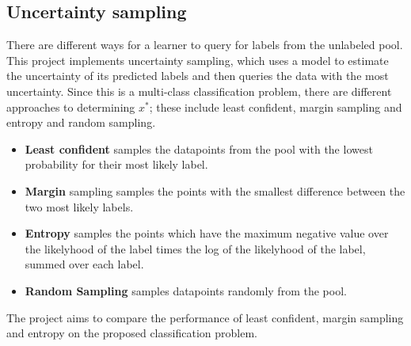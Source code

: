 \documentclass[12pt,fleqn]{article}
\begin{document}
\begin{multicols}{2}
		\subsection{Uncertainty sampling}
		There are different ways for a learner to query for labels from the unlabeled pool. This project implements uncertainty sampling, which uses a model to estimate the uncertainty of its predicted labels and then queries the data with the most uncertainty. Since this is a multi-class classification problem, there are different approaches to determining $x^*$; these include least confident, margin sampling and entropy and random sampling. 
		
		\begin{itemize}
			\item \textbf{Least confident} samples the datapoints from the pool with the lowest probability for their most likely label.
			\item \textbf{Margin} sampling samples the points with the smallest difference between the two most likely labels.
			\item \textbf{Entropy} samples the points which have the maximum negative value over the likelyhood of the label times the log of the likelyhood of the label, summed over each label.
			\item \textbf{Random Sampling} samples datapoints randomly from the pool.
		\end{itemize}
		 
		The project aims to compare the performance of least confident, margin sampling and entropy on the proposed classification problem. 
		 
	\end{multicols}		
\end{document}
